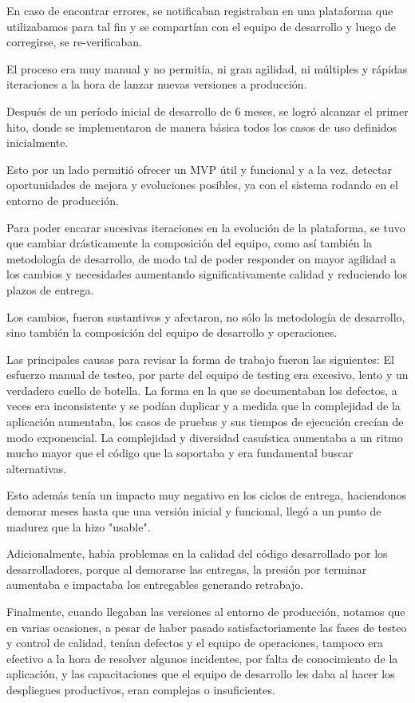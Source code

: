 En caso de encontrar errores, se notificaban registraban en una plataforma que utilizabamos para tal fin y se compartían con el equipo de desarrollo y luego de corregirse, se re-verificaban. 


El proceso era muy manual y no permitía, ni gran agilidad, ni múltiples y rápidas iteraciones a la hora de lanzar nuevas versiones a producción.


Después de un período inicial de desarrollo de 6 meses, se logró alcanzar el primer hito, donde se implementaron de manera básica todos los casos de uso definidos inicialmente. 


Esto por un lado permitió ofrecer un MVP útil y funcional y a la vez, detectar oportunidades de mejora y evoluciones posibles, ya con el sistema rodando en el entorno de producción.


Para poder encarar sucesivas iteraciones en la evolución de la plataforma, se tuvo que cambiar drásticamente la composición del equipo, como así también la metodología de desarrollo, de modo tal de poder responder on mayor agilidad a los cambios y necesidades aumentando significativamente calidad y reduciendo los plazos de entrega.


Los cambios, fueron sustantivos y afectaron, no sólo la metodología de desarrollo, sino también la composición del equipo de desarrollo y operaciones.


Las principales causas para revisar la forma de trabajo fueron las siguientes:
El esfuerzo manual de testeo, por parte del equipo de testing era excesivo, lento y un verdadero cuello de botella. La forma en la que se documentaban los defectos, a veces era inconsistente y se podían duplicar y a medida que la complejidad de la aplicación aumentaba, los casos de pruebas y sus tiempos de ejecución crecían de modo exponencial. La complejidad y diversidad casuística aumentaba a un ritmo mucho mayor que el código que la soportaba y era fundamental buscar alternativas.


Esto además tenía un impacto muy negativo en los ciclos de entrega, haciendonos demorar meses hasta que una versión inicial y funcional, llegó a un punto de madurez que la hizo "usable".


Adicionalmente, había problemas en la calidad del código desarrollado por los desarrolladores, porque al demorarse las entregas, la presión por terminar aumentaba e impactaba los entregables generando retrabajo. 


Finalmente, cuando llegaban las versiones al entorno de producción, notamos que en varias ocasiones, a pesar de haber pasado satisfactoriamente las fases de testeo y control de calidad, tenían defectos y el equipo de operaciones, tampoco era efectivo a la hora de resolver algunos incidentes, por falta de conocimiento de la aplicación, y las capacitaciones que el equipo de desarrollo les daba al hacer los despliegues productivos, eran complejas o insuficientes.

